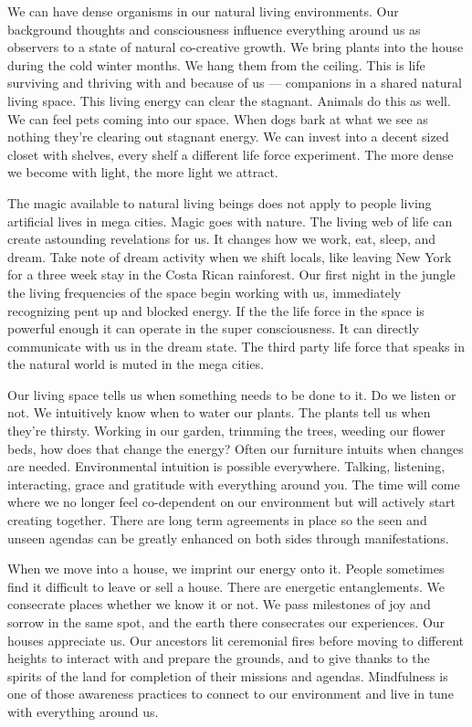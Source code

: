 We can have dense organisms in our natural living environments. Our
background thoughts and consciousness influence everything around us as
observers to a state of natural co-creative growth. We bring plants into
the house during the cold winter months. We hang them from the ceiling.
This is life surviving and thriving with and because of us ---
companions in a shared natural living space. This living energy can
clear the stagnant. Animals do this as well. We can feel pets coming
into our space. When dogs bark at what we see as nothing they're
clearing out stagnant energy. We can invest into a decent sized closet
with shelves, every shelf a different life force experiment. The more
dense we become with light, the more light we attract.

The magic available to natural living beings does not apply to people
living artificial lives in mega cities. Magic goes with nature. The
living web of life can create astounding revelations for us. It changes
how we work, eat, sleep, and dream. Take note of dream activity when we
shift locals, like leaving New York for a three week stay in the Costa
Rican rainforest. Our first night in the jungle the living frequencies
of the space begin working with us, immediately recognizing pent up and
blocked energy. If the the life force in the space is powerful enough it
can operate in the super consciousness. It can directly communicate with
us in the dream state. The third party life force that speaks in the
natural world is muted in the mega cities.

Our living space tells us when something needs to be done to it. Do we
listen or not. We intuitively know when to water our plants. The plants
tell us when they're thirsty. Working in our garden, trimming the trees,
weeding our flower beds, how does that change the energy? Often our
furniture intuits when changes are needed. Environmental intuition is
possible everywhere. Talking, listening, interacting, grace and
gratitude with everything around you. The time will come where we no
longer feel co-dependent on our environment but will actively start
creating together. There are long term agreements in place so the seen
and unseen agendas can be greatly enhanced on both sides through
manifestations.

When we move into a house, we imprint our energy onto it. People
sometimes find it difficult to leave or sell a house. There are
energetic entanglements. We consecrate places whether we know it or not.
We pass milestones of joy and sorrow in the same spot, and the earth
there consecrates our experiences. Our houses appreciate us. Our
ancestors lit ceremonial fires before moving to different heights to
interact with and prepare the grounds, and to give thanks to the spirits
of the land for completion of their missions and agendas. Mindfulness is
one of those awareness practices to connect to our environment and live
in tune with everything around us.

